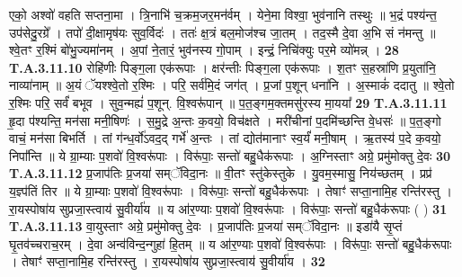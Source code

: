 \documentclass[17pt]{extarticle}
\begin{document}
                  एको॒ अश्वो॑ वहति सप्तना॒मा । त्रि॒नाभि॑ च॒क्रम॒जर॒मन॑र्वम् । येने॒मा विश्वा॒ भुव॑नानि तस्थुः ॥ भ॒द्रं पश्य॑न्त॒ उप॑सेदु॒रग्रे᳚ ।  तपो॑ दी॒क्षामृष॑यः सुव॒र्विदः॑ । ततः॑ क्ष॒त्रं बल॒मोज॑श्च जा॒तम् । तद॒स्मै दे॒वा अ॒भि सं न॑मन्तु ॥ श्वे॒तꣳ र॒श्मिं बो॑भु॒ज्यमा॑नम् ।  अ॒पां ने॒तारं॒ भुव॑नस्य गो॒पाम् ।  इन्द्रं॒ निचि॑क्युः पर॒मे व्यो॑मन्न् । \textbf{ 28} \newline
                  \newline
                                                                  \textbf{ T.A.3.11.10} \newline
                  रोहि॑णीः पिङ्ग॒ला एक॑रूपाः । क्षर॑न्तीः पिङ्ग॒ला एक॑रूपाः । श॒तꣳ स॒हस्रा॑णि प्र॒युता॑नि॒ नाव्या॑नाम् ॥ अ॒यं ॅयश्श्वे॒तो र॒श्मिः । परि॒ सर्व॑मि॒दं जग॑त् । प्र॒जां प॒शून् धना॑नि । अ॒स्माकं॑ ददातु ॥  श्वे॒तो र॒श्मिः परि॒ सर्वं॑ बभूव । सुव॒न्मह्यं॑ प॒शून्. वि॒श्वरू॑पान् ॥ प॒त॒ङ्गम॒क्तमसु॑रस्य मा॒यया᳚ \textbf{ 29} \newline
                  \newline
                                                                  \textbf{ T.A.3.11.11} \newline
                  हृ॒दा प॑श्यन्ति॒ मन॑सा मनी॒षिणः॑ । स॒मु॒द्रे अ॒न्तः क॒वयो॒ विच॑क्षते । मरी॑चीनां प॒दमि॑च्छन्ति वे॒धसः॑ ॥ प॒त॒ङ्गो वाचं॒ मन॑सा बिभर्ति ।  तां ग॑न्ध॒र्वो॑ऽवद॒द् गर्भे॑ अ॒न्तः । तां द्योत॑मानाꣳ स्व॒र्यं॑ मनी॒षाम् ।  ऋ॒तस्य॑ प॒दे क॒वयो॒ निपा᳚न्ति ॥ ये ग्रा॒म्याः प॒शवो॑ वि॒श्वरू॑पाः । विरू॑पाः॒ सन्तो॑ बहु॒धैक॑रूपाः । अ॒ग्निस्ताꣳ अग्रे॒ प्रमु॑मोक्तु दे॒वः \textbf{ 30} \newline
                  \newline
                                                                  \textbf{ T.A.3.11.12} \newline
                  प्र॒जाप॑तिः प्र॒जया॑ सम्ॅविदा॒नः ॥ वी॒तꣳ स्तु॑केस्तुके । यु॒वम॒स्मासु॒ निय॑च्छतम् । प्रप्र॑ य॒ज्ञ्प॑तिं तिर ॥ ये ग्रा॒म्याः प॒शवो॑ वि॒श्वरू॑पाः । विरू॑पाः॒ सन्तो॑ बहु॒धैक॑रूपाः ।  तेषाꣳ॑ सप्ता॒नामि॒ह रन्ति॑रस्तु ।  रा॒यस्पोषा॑य सुप्रजा॒स्त्वाय॑ सु॒वीर्या॑य ॥  य आ॑र॒ण्याः प॒शवो॑ वि॒श्वरू॑पाः ।  विरू॑पाः॒ सन्तो॑ बहु॒धैक॑रूपाः ( ) \textbf{ 31} \newline
                  \newline
                                                                  \textbf{ T.A.3.11.13} \newline
                  वा॒युस्ताꣳ अग्रे॒ प्रमु॑मोक्तु दे॒वः । प्र॒जाप॑तिः प्र॒जया॑ सम्ॅविदा॒नः ॥ इडा॑यै सृ॒प्तं घृ॒तव॑च्चराच॒रम् । दे॒वा अन्व॑विन्द॒न्गुहा॑ हि॒तम् ॥  य आ॑र॒ण्याः प॒शवो॑ वि॒श्वरू॑पाः । विरू॑पाः॒ सन्तो॑ बहु॒धैक॑रूपाः । तेषाꣳ॑ सप्ता॒नामि॒ह रन्ति॑रस्तु ।  रा॒यस्पोषा॑य सुप्रजा॒स्त्वाय॑ सु॒वीर्या॑य । \textbf{ 32} \newline
\end{document}
